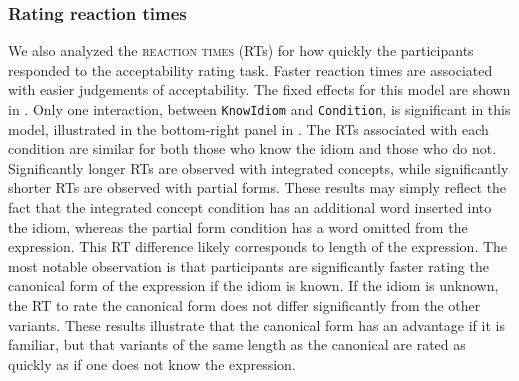 \documentclass[output=paper,modfonts,nonflat]{langsci/langscibook}
\begin{document}
\subsubsection{Rating reaction times}

We also analyzed the \textsc{reaction times} (RTs) for how quickly the participants responded to the acceptability rating task. Faster reaction times are associated with easier judgements of acceptability. The fixed effects for this model are shown in . Only one interaction, between \texttt{KnowIdiom} and \texttt{Condition}, is significant in this model, illustrated in the bottom-right panel in . The RTs associated with each condition are similar for both those who know the idiom and those who do not. Significantly longer RTs are observed with integrated concepts, while significantly shorter RTs are observed with partial forms. These results may simply reflect the fact that the integrated concept  condition has an additional word inserted into the idiom, whereas the partial form condition has a word omitted from the expression. This RT difference likely corresponds to length of the expression. The most notable observation is that participants are significantly faster rating the canonical form of the expression if the idiom is known. If the idiom is unknown, the RT to rate the canonical form does not differ significantly from the other variants. These results illustrate that the canonical form has an advantage if it is familiar, but that variants of the same length as the canonical are rated as quickly as if one does not know the expression.\\ 
\end{document}
